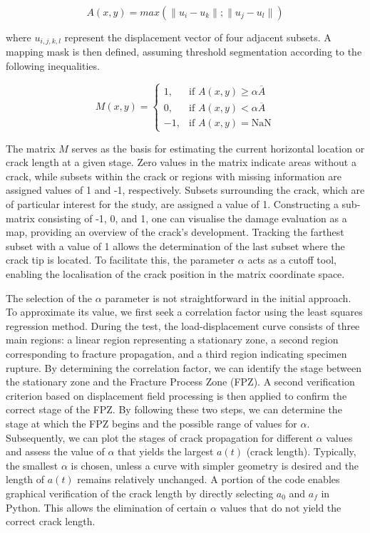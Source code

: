 \documentclass[3p,times,procedia]{elsarticle}
\begin{document}
\vspace{0pt}
\begin{equation}
	A(x,y)=max(\lVert u_i-u_k\rVert;\lVert u_j-u_l\rVert)
	\label{eq:eq21}
\end{equation}

where $u_{i,j,k,l}$ represent the displacement vector of four adjacent subsets. A mapping mask is then defined, assuming threshold segmentation according to the following inequalities.

\begin{equation}
	M(x,y)=
	\begin{cases}
		1, & \text{if } A(x, y) \geq \alpha \overline{A} \\
		0, & \text{if } A(x, y) < \alpha \overline{A} \\
		-1, & \text{if } A(x, y) = \textrm{NaN}
	\end{cases}
	\label{eq:eq22}
\end{equation}

The matrix $M$ serves as the basis for estimating the current horizontal location or crack length at a given stage. Zero values in the matrix indicate areas without a crack, while subsets within the crack or regions with missing information are assigned values of 1 and -1, respectively. Subsets surrounding the crack, which are of particular interest for the study, are assigned a value of 1. Constructing a sub-matrix consisting of -1, 0, and 1, one can visualise the damage evaluation as a map, providing an overview of the crack's development. Tracking the farthest subset with a value of 1 allows the determination of the last subset where the crack tip is located. To facilitate this, the parameter $\alpha$ acts as a cutoff tool, enabling the localisation of the crack position in the matrix coordinate space.

The selection of the $\alpha$ parameter is not straightforward in the initial approach. To approximate its value, we first seek a correlation factor using the least squares regression method. During the test, the load-displacement curve consists of three main regions: a linear region representing a stationary zone, a second region corresponding to fracture propagation, and a third region indicating specimen rupture. By determining the correlation factor, we can identify the stage between the stationary zone and the Fracture Process Zone (FPZ). A second verification criterion based on displacement field processing is then applied to confirm the correct stage of the FPZ. By following these two steps, we can determine the stage at which the FPZ begins and the possible range of values for $\alpha$. Subsequently, we can plot the stages of crack propagation for different $\alpha$ values and assess the value of $\alpha$ that yields the largest $a(t)$ (crack length). Typically, the smallest $\alpha$ is chosen, unless a curve with simpler geometry is desired and the length of $a(t)$ remains relatively unchanged. A portion of the code enables graphical verification of the crack length by directly selecting $a_0$ and $a_f$ in Python. This allows the elimination of certain $\alpha$ values that do not yield the correct crack length.
\end{document}

